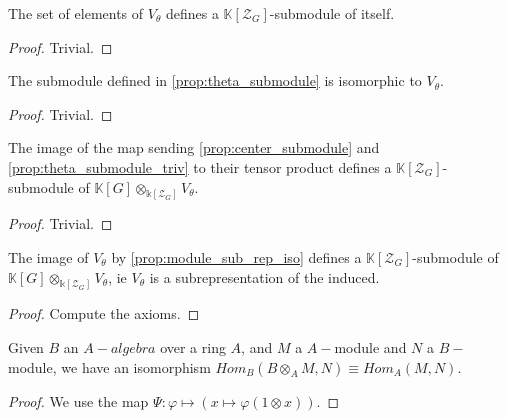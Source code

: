 \begin{proposition}
    \label{prop:theta_submodule}
    \uses{}
    \leanok 
    The set of elements of $V_\theta$ defines a $\mathbb{K}[\mathcal{Z}_G]$-submodule of itself.
\end{proposition}
\begin{proof}
    \leanok
    Trivial.
\end{proof}

\begin{proposition}
    \label{prop:theta_submodule_triv}
    \leanok 
    The submodule defined in \ref{prop:theta_submodule} is isomorphic to $V_\theta$.
\end{proposition}
\begin{proof}
    \leanok
    Trivial.
\end{proof}

\begin{proposition}
    \label{prop:center_times_theta_submodule}
    \leanok 
    The image of the map sending \ref{prop:center_submodule} and \ref{prop:theta_submodule_triv}
    to their tensor product defines a $\mathbb{K}[\mathcal{Z}_G]$-submodule of 
    $\mathbb{K}[G]\otimes_{\mathbb{k}[\mathcal{Z}_G]}V_\theta$.
\end{proposition}
\begin{proof}
    \leanok
    Trivial.
\end{proof}

\begin{proposition}
    \label{prop:subsubsub}
    \leanok 
    The image of $V_\theta$ by \ref{prop:module_sub_rep_iso} defines a $\mathbb{K}[\mathcal{Z}_G]$-submodule of 
    $\mathbb{K}[G]\otimes_{\mathbb{k}[\mathcal{Z}_G]}V_\theta$, ie $V_\theta$ is a 
    subrepresentation of the induced.
\end{proposition}
\begin{proof}
    \leanok
    Compute the axioms.
\end{proof}

\begin{proposition}
    \label{prop:lemma_tensor}
    \uses{}
    \leanok 
    Given $B$ an $A-algebra$ over a ring $A$, and $M$ a $A-$module and $N$
    a $B-$module, we have an isomorphism $Hom_B(B\otimes_A M, N)\equiv Hom_A(M,N)$. 
\end{proposition}
\begin{proof}
    \leanok
    We use the map $\Psi : \varphi \mapsto \left(x\mapsto \varphi (1\otimes x)\right)$.
\end{proof}

